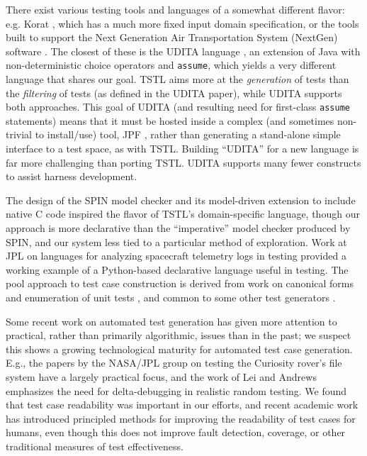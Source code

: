 There exist various testing tools and languages of a somewhat
different flavor: e.g. Korat \cite{Korat}, which has a much more fixed
input domain specification, or the tools built to support the Next
Generation Air Transportation System (NextGen) software
\cite{TameInputs}.  The closest of these is the UDITA language
\cite{UDITA}, an extension of Java with non-deterministic choice
operators and {\tt assume}, which yields a very different language
that shares our goal.  TSTL aims more at the \emph{generation} of
tests than the \emph{filtering} of tests (as defined in the UDITA
paper), while UDITA supports both approaches.  This goal of UDITA (and
resulting need for first-class {\tt assume} statements) means that it
must be hosted inside a complex (and sometimes non-trivial to
install/use) tool, JPF \cite{JPF2}, rather than generating a
stand-alone simple interface to a test space, as with TSTL.  Building
``UDITA'' for a new language is far more challenging than porting
TSTL.  UDITA supports many fewer constructs to assist harness
development.

The design of the SPIN model checker \cite{SPIN} and its model-driven
extension to include native C code \cite{ModelDriven} inspired the
flavor of TSTL's domain-specific language, though our approach is more
declarative than the ``imperative'' model checker produced by SPIN,
and our system less tied to a particular method of exploration.
Work at JPL on languages for analyzing spacecraft telemetry
logs in testing \cite{scriptstospecs} provided a working example of a
Python-based declarative language useful in testing.  The pool
approach to test case construction is derived from work on canonical
forms and enumeration of unit tests \cite{AndrewsTR}, and common to
some other test generators \cite{Pacheco}.

Some recent work on automated test generation has given more attention
to practical, rather than primarily algorithmic, issues than in the
past; we suspect this shows a growing technological maturity for
automated test case generation.  E.g., the papers by the NASA/JPL
group on testing the Curiosity rover's file system
\cite{ICSEDiff,CFV08,AMAI} have a largely practical focus, and the
work of Lei and Andrews \cite{MinUnit} emphasizes the need for
delta-debugging in realistic random testing.  We found that test case
readability was important in our efforts, and recent academic work
\cite{Readable,Guava} has introduced principled methods for improving
the readability of test cases for humans, even though this does not
improve fault detection, coverage, or other traditional measures of
test effectiveness.

